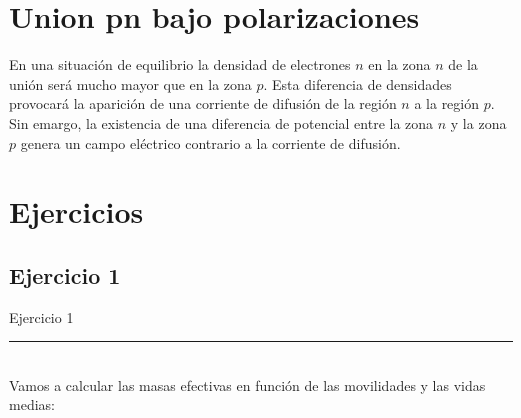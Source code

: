 \section{Union pn bajo polarizaciones}

En una situación de equilibrio la densidad de electrones $n$ en la zona $n$ de la unión será mucho mayor que en la zona $p$. Esta diferencia de densidades provocará la aparición de una corriente de difusión de la región $n$ a la región $p$. Sin emargo, la existencia de una diferencia de potencial entre la zona $n$ y la zona $p$ genera un campo eléctrico contrario a la corriente de difusión.






\newpage

\section{Ejercicios}



\subsection{Ejercicio 1}


Ejercicio 1


\rule{\textwidth}{0.1pt} \\[2pt]

Vamos a calcular las masas efectivas en función de las movilidades y las vidas medias:

